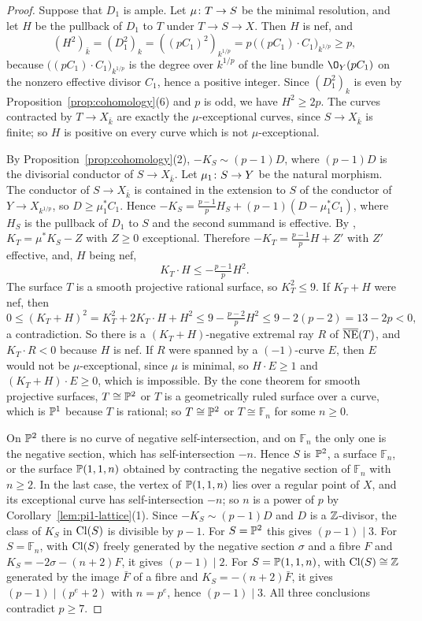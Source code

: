 \begin{proof}
Suppose that $D_1$ is ample.
Let $\mu\colon T\to S$ be the minimal resolution, and let $H$ be the pullback of $D_1$ to $T$ under $T\to S\to X$.
Then $H$ is nef, and
\[
  (H^2)_{\bar k} = (D_1^2)_k = ((pC_1)^2)_{k^{1/p}} = p\,\bigl((pC_1)\cdot C_1\bigr)_{k^{1/p}}\geq p,
\]
because $\bigl((pC_1)\cdot C_1\bigr)_{k^{1/p}}$ is the degree over $k^{1/p}$ of the line bundle $\O_Y(pC_1)$ on the nonzero effective divisor $C_1$, hence a positive integer.
Since $(D_1^2)_k$ is even by Proposition~\ref{prop:cohomology}(6) and $p$ is odd, we have $H^2\geq 2p$.
The curves contracted by $T\to X_{\bar k}$ are exactly the $\mu$-exceptional curves, since $S\to X_{\bar k}$ is finite; so $H$ is positive on every curve which is not $\mu$-exceptional.

By Proposition~\ref{prop:cohomology}(2), $-K_S\sim(p-1)D$, where $(p-1)D$ is the divisorial conductor of $S\to X_{\bar k}$.
Let $\mu_1\colon S\to Y$ be the natural morphism.
The conductor of $S\to X_{\bar k}$ is contained in the extension to $S$ of the conductor of $Y\to X_{k^{1/p}}$, so $D\geq\mu_1^*C_1$.
Hence $-K_S = \tfrac{p-1}{p}H_S+(p-1)(D-\mu_1^*C_1)$, where $H_S$ is the pullback of $D_1$ to $S$ and the second summand is effective.
By \cite[Theorem~10.5 and Claim~10.3.5]{Kol13}, $K_T = \mu^*K_S-Z$ with $Z\geq 0$ exceptional.
Therefore $-K_T = \tfrac{p-1}{p}H+Z'$ with $Z'$ effective, and, $H$ being nef,
\[
  K_T\cdot H\leq-\tfrac{p-1}{p}H^2.
\]
The surface $T$ is a smooth projective rational surface, so $K_T^2\leq 9$.
If $K_T+H$ were nef, then
\[
  0\leq(K_T+H)^2 = K_T^2+2K_T\cdot H+H^2\leq 9-\tfrac{p-2}{p}H^2\leq 9-2(p-2) = 13-2p<0,
\]
a contradiction.
So there is a $(K_T+H)$-negative extremal ray $R$ of $\overline{\operatorname{NE}}(T)$, and $K_T\cdot R<0$ because $H$ is nef.
If $R$ were spanned by a $(-1)$-curve $E$, then $E$ would not be $\mu$-exceptional, since $\mu$ is minimal, so $H\cdot E\geq 1$ and $(K_T+H)\cdot E\geq 0$, which is impossible.
By the cone theorem for smooth projective surfaces, $T\cong\mathbb{P}^2$ or $T$ is a geometrically ruled surface over a curve, which is $\mathbb{P}^1$ because $T$ is rational; so $T\cong\mathbb{P}^2$ or $T\cong\mathbb F_n$ for some $n\geq 0$.

On $\mathbb{P}^2$ there is no curve of negative self-intersection, and on $\mathbb F_n$ the only one is the negative section, which has self-intersection $-n$.
Hence $S$ is $\mathbb{P}^2$, a surface $\mathbb F_n$, or the surface $\mathbb{P}(1,1,n)$ obtained by contracting the negative section of $\mathbb F_n$ with $n\geq 2$.
In the last case, the vertex of $\mathbb{P}(1,1,n)$ lies over a regular point of $X$, and its exceptional curve has self-intersection $-n$; so $n$ is a power of $p$ by Corollary~\ref{lem:pi1-lattice}(1).
Since $-K_S\sim(p-1)D$ and $D$ is a $\mathbb{Z}$-divisor, the class of $K_S$ in $\operatorname{Cl}(S)$ is divisible by $p-1$.
For $S = \mathbb{P}^2$ this gives $(p-1)\mid 3$.
For $S = \mathbb F_n$, with $\operatorname{Cl}(S)$ freely generated by the negative section $\sigma$ and a fibre $F$ and $K_S = -2\sigma-(n+2)F$, it gives $(p-1)\mid 2$.
For $S = \mathbb{P}(1,1,n)$, with $\operatorname{Cl}(S)\cong\mathbb{Z}$ generated by the image $\bar F$ of a fibre and $K_S = -(n+2)\bar F$, it gives $(p-1)\mid(p^e+2)$ with $n = p^e$, hence $(p-1)\mid 3$.
All three conclusions contradict $p\geq 7$.
\end{proof}

